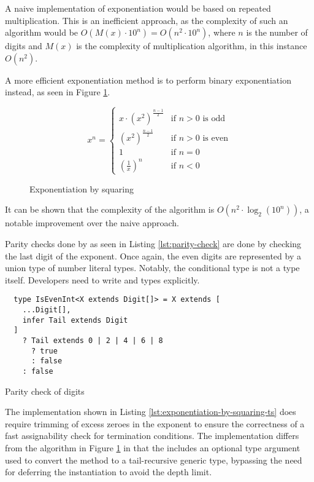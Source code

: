 A naive implementation of exponentiation would be based on repeated multiplication. This is an inefficient approach, as the complexity of such an algorithm would be $O(M(x) \cdot 10^n) = O(n^2 \cdot 10^n)$, where $n$ is the number of digits and $M(x)$ is the complexity of multiplication algorithm, in this instance $O(n^2)$.

A more efficient exponentiation method is to perform binary exponentiation instead, as seen in Figure \ref{fig:exponentiation-by-squaring}.

\begin{figure}[ht]
  \begin{equation*}
    x^n =
    \begin{cases}
      x \cdot (x^2)^\frac{n-1}{2} & \text{if } n > 0 \text{ is odd}  \\
      (x^2)^\frac{n-1}{2}         & \text{if } n > 0 \text{ is even} \\
      1                           & \text{if } n = 0                 \\
      (\frac{1}{x})^n             & \text{if } n < 0
    \end{cases}
  \end{equation*}
  \caption{Exponentiation by squaring}\label{fig:exponentiation-by-squaring}
\end{figure}

It can be shown that the complexity of the algorithm is $O(n^2 \cdot \log_2(10^n))$, a notable improvement over the naive approach.

Parity checks done by  as seen in Listing \ref{lst:parity-check} are done by checking the last digit of the exponent. Once again, the even digits are represented by a union type of number literal types. Notably, the conditional type is not a type itself. Developers need to write  and  types explicitly.

\begin{listing}[ht]
  \begin{verbatim}
  type IsEvenInt<X extends Digit[]> = X extends [
    ...Digit[],
    infer Tail extends Digit
  ]
    ? Tail extends 0 | 2 | 4 | 6 | 8
      ? true
      : false
    : false
  \end{verbatim}
  \caption{Parity check of digits}\label{lst:parity-check}
\end{listing}

The implementation shown in Listing \ref{lst:exponentiation-by-squaring-ts} does require trimming of excess zeroes in the exponent to ensure the correctness of a fast assignability check for termination conditions. The implementation differs from the algorithm in Figure \ref{fig:exponentiation-by-squaring} in that the  includes an optional type argument  used to convert the method to a tail-recursive generic type, bypassing the need for deferring the instantiation to avoid the depth limit.

